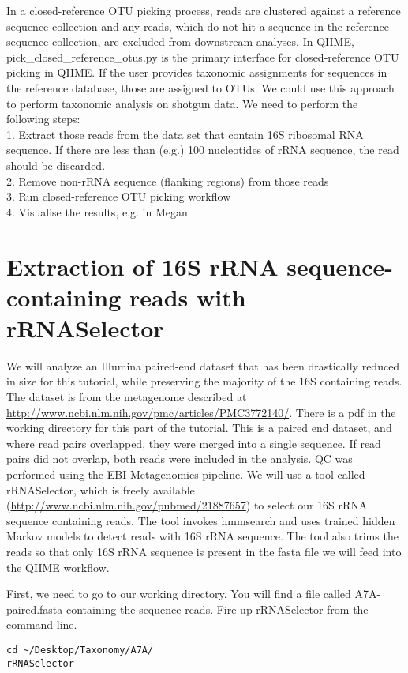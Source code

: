 In a closed-reference OTU picking process, reads are clustered against a reference sequence collection and any reads, which do not hit a sequence in the reference sequence collection, are excluded from downstream analyses. In QIIME, pick\_closed\_reference\_otus.py is the primary interface for closed-reference OTU picking in QIIME. If the user provides taxonomic assignments for sequences in the reference database, those are assigned to OTUs. We could use this approach to perform taxonomic analysis on shotgun data. We need to perform the following steps:\\
1.	Extract those reads from the data set that contain 16S ribosomal RNA sequence. If there are less than (e.g.) 100 nucleotides of rRNA sequence, the read should be discarded.\\
2.	Remove non-rRNA sequence (flanking regions) from those reads\\
3.	Run closed-reference OTU picking workflow\\
4.	Visualise the results, e.g. in Megan\\

\section{Extraction of 16S rRNA sequence-containing reads with rRNASelector}

We will analyze an Illumina paired-end dataset that has been drastically reduced in size for this tutorial, while preserving the majority of the 16S containing reads. The dataset is from the metagenome described at \url{http://www.ncbi.nlm.nih.gov/pmc/articles/PMC3772140/}. There is a pdf in the working directory for this part of the tutorial. This is a paired end dataset, and where read pairs overlapped, they were merged into a single sequence. If read pairs did not overlap, both reads were included in the analysis. QC was performed using the EBI Metagenomics pipeline.
We will use a tool called rRNASelector, which is freely available (\url{http://www.ncbi.nlm.nih.gov/pubmed/21887657}) to select our 16S rRNA sequence containing reads.  The tool invokes hmmsearch and uses trained hidden Markov models to detect reads with 16S rRNA sequence. The tool also trims the reads so that only 16S rRNA sequence is present in the fasta file we will feed into the QIIME workflow.

\begin{steps}
First, we need to go to our working directory.
You will find a file called A7A-paired.fasta containing the sequence reads.
Fire up rRNASelector from the command line.

\begin{lstlisting}
cd ~/Desktop/Taxonomy/A7A/
rRNASelector
\end{lstlisting}
\end{steps}

